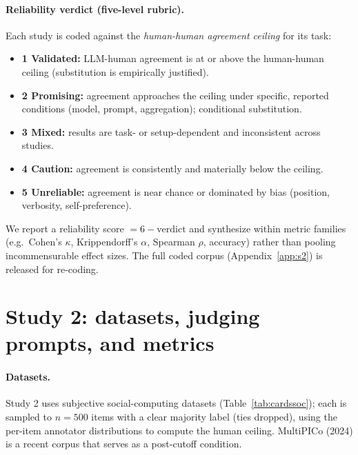 \paragraph{Reliability verdict (five-level rubric).} Each study is coded against the \emph{human-human agreement
ceiling} for its task:
\begin{itemize}[leftmargin=1.4em,itemsep=1pt]
\item \textbf{1 Validated:} LLM-human agreement is at or above the human-human ceiling (substitution is empirically
justified).
\item \textbf{2 Promising:} agreement approaches the ceiling under specific, reported conditions (model, prompt,
aggregation); conditional substitution.
\item \textbf{3 Mixed:} results are task- or setup-dependent and inconsistent across studies.
\item \textbf{4 Caution:} agreement is consistently and materially below the ceiling.
\item \textbf{5 Unreliable:} agreement is near chance or dominated by bias (position, verbosity, self-preference).
\end{itemize}
We report a reliability score $=6-\text{verdict}$ and synthesize within metric families (e.g.\ Cohen's $\kappa$,
Krippendorff's $\alpha$, Spearman $\rho$, accuracy) rather than pooling incommensurable effect sizes. The full coded corpus (Appendix~\ref{app:s2}) is released for re-coding.

\section{Study 2: datasets, judging prompts, and metrics}\label{app:s3detail}
\paragraph{Datasets.} Study 2 uses \SOCndat{} subjective social-computing datasets (Table~\ref{tab:cardssoc}); each
is sampled to $n{=}500$ items with a clear majority label (ties dropped), using the per-item annotator distributions
to compute the human ceiling. MultiPICo (2024) is a recent corpus that serves as a post-cutoff condition.

\begin{table}[h]\centering\small
\caption{Study 2 dataset cards. Ceiling $=$ random-annotator-vs-majority accuracy.}
\label{tab:cardssoc}

\end{table}

